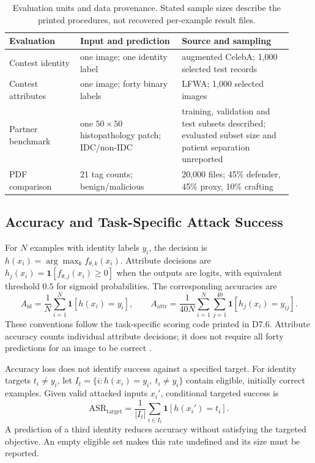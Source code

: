 \begin{table}[tbp]
  \caption{Evaluation units and data provenance. Stated sample sizes describe the printed
    procedures, not recovered per-example result files.}
  \label{tab:advml:data}
  \centering\small
  \begin{tabular}{@{}p{0.23\linewidth}p{0.33\linewidth}p{0.36\linewidth}@{}}
    \toprule
    \textbf{Evaluation} & \textbf{Input and prediction} & \textbf{Source and sampling} \\
    \midrule
    Contest identity & one image; one identity label & augmented CelebA; 1,000 selected test records \cite{sparta2022d76} \\
    Contest attributes & one image; forty binary labels & LFWA; 1,000 selected images \cite{sparta2022d76} \\
    Partner benchmark & one $50\times50$ histopathology patch; IDC/non-IDC & training, validation and test subsets described; evaluated subset size and patient separation unreported \cite{sparta2020d72} \\
    PDF comparison & 21 tag counts; benign/malicious & 20,000 files; 45\% defender, 45\% proxy, 10\% crafting \cite{sparta2021d75} \\
    \bottomrule
  \end{tabular}
\end{table}

\subsection{Accuracy and Task-Specific Attack Success}

For $N$ examples with identity labels $y_i$, the decision is
$h(x_i)=\arg\max_k f_{\theta,k}(x_i)$. Attribute decisions are
$h_j(x_i)=\mathbf1[f_{\theta,j}(x_i)\geq0]$ when the outputs are logits, with equivalent
threshold $0.5$ for sigmoid probabilities. The corresponding accuracies are
\begin{equation}
  A_{\mathrm{id}}=\frac1N\sum_{i=1}^N\mathbf1[h(x_i)=y_i],
  \qquad
  A_{\mathrm{attr}}=\frac1{40N}\sum_{i=1}^N\sum_{j=1}^{40}
                   \mathbf1[h_j(x_i)=y_{ij}].
  \label{eq:advml:accuracies}
\end{equation}
These conventions follow the task-specific scoring code printed in D7.6. Attribute accuracy
counts individual attribute decisions; it does not require all forty predictions for an
image to be correct \cite{sparta2022d76}.

Accuracy loss does not identify success against a specified target. For identity targets
$t_i\neq y_i$, let $I_t=\{i:h(x_i)=y_i,\ t_i\neq y_i\}$ contain eligible, initially correct
examples. Given valid attacked inputs $x_i'$, conditional targeted success is
\begin{equation}
  \mathrm{ASR}_{\mathrm{target}}
  =\frac{1}{|I_t|}\sum_{i\in I_t}\mathbf1[h(x_i')=t_i].
  \label{eq:advml:targeted}
\end{equation}
A prediction of a third identity reduces accuracy without satisfying the targeted objective.
An empty eligible set makes this rate undefined and its size must be reported.

